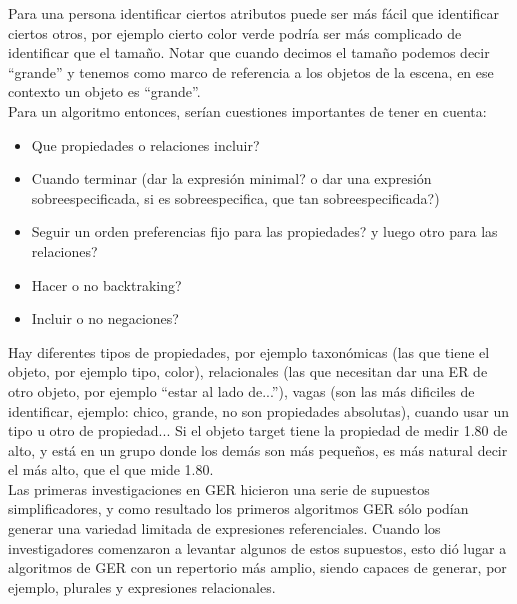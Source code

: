 
Para una persona identificar ciertos atributos puede ser m\'as f\'acil que identificar ciertos otros, por ejemplo cierto color verde podr\'{i}a ser m\'as complicado de identificar que el tama\~no. Notar que cuando decimos el tama\~no podemos decir ``grande'' y tenemos como marco de referencia a los objetos de la escena, en ese contexto un objeto es ``grande''.\\

Para un algoritmo entonces, ser\'ian cuestiones importantes de tener en cuenta:

\begin{itemize}
 \item Que propiedades o relaciones incluir?
 \item Cuando terminar (dar la expresi\'on minimal? o dar una expresi\'on sobreespecificada, si es sobreespecifica, que tan sobreespecificada?)
 \item Seguir un orden preferencias fijo para las propiedades? y luego otro para las relaciones?
 \item Hacer o no backtraking?
 \item Incluir o no negaciones?
\end{itemize}


Hay diferentes tipos de propiedades, por ejemplo taxon\'omicas (las que tiene el objeto, por ejemplo tipo, color), relacionales (las que necesitan dar una ER de otro objeto, por ejemplo ``estar al lado de...''), vagas (son las m\'as dificiles de identificar, ejemplo: chico, grande, no son propiedades absolutas), cuando usar un tipo u otro de propiedad... 
Si el objeto target tiene la propiedad de medir 1.80 de alto, y est\'a en un grupo donde los dem\'as son m\'as peque\~nos, es m\'as natural decir el m\'as alto, que el que mide 1.80.\\



Las primeras investigaciones en GER hicieron una serie de supuestos simplificadores, y como resultado los primeros
algoritmos GER s\'olo pod\'ian generar una variedad limitada de expresiones referenciales. Cuando
los investigadores comenzaron a levantar algunos de estos supuestos, esto di\'o lugar a algoritmos de GER
con un repertorio m\'as amplio, siendo capaces de generar, por ejemplo, plurales y expresiones relacionales. \\

